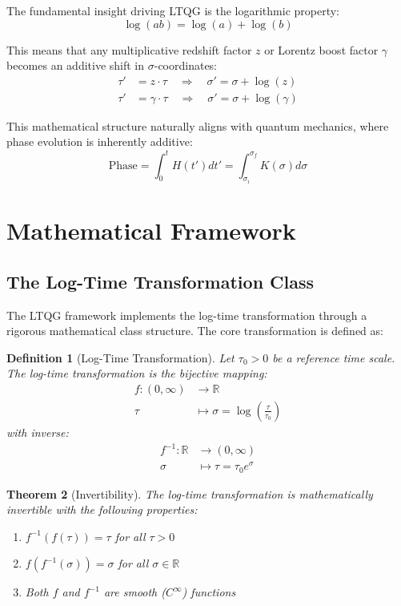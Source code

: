 \documentclass[11pt,a4paper]{article}
\newtheorem{theorem}{Theorem}[section]
\newtheorem{definition}[theorem]{Definition}
\begin{document}
The fundamental insight driving LTQG is the logarithmic property:
\begin{equation}
\log(ab) = \log(a) + \log(b)
\end{equation}

This means that any multiplicative redshift factor $z$ or Lorentz boost factor $\gamma$ becomes an additive shift in $\sigma$-coordinates:
\begin{align}
\tau' &= z \cdot \tau \quad \Rightarrow \quad \sigma' = \sigma + \log(z) \\
\tau' &= \gamma \cdot \tau \quad \Rightarrow \quad \sigma' = \sigma + \log(\gamma)
\end{align}

This mathematical structure naturally aligns with quantum mechanics, where phase evolution is inherently additive:
\begin{equation}
\text{Phase} = \int_0^t H(t') dt' = \int_{\sigma_i}^{\sigma_f} K(\sigma) d\sigma
\end{equation}

\section{Mathematical Framework}

\subsection{The Log-Time Transformation Class}

The LTQG framework implements the log-time transformation through a rigorous mathematical class structure. The core transformation is defined as:

\begin{definition}[Log-Time Transformation]
Let $\tau_0 > 0$ be a reference time scale. The log-time transformation is the bijective mapping:
\begin{align}
f: (0, \infty) &\to \mathbb{R} \\
\tau &\mapsto \sigma = \log\left(\frac{\tau}{\tau_0}\right)
\end{align}
with inverse:
\begin{align}
f^{-1}: \mathbb{R} &\to (0, \infty) \\
\sigma &\mapsto \tau = \tau_0 e^{\sigma}
\end{align}
\end{definition}

\begin{theorem}[Invertibility]
The log-time transformation is mathematically invertible with the following properties:
\begin{enumerate}
\item $f^{-1}(f(\tau)) = \tau$ for all $\tau > 0$
\item $f(f^{-1}(\sigma)) = \sigma$ for all $\sigma \in \mathbb{R}$
\item Both $f$ and $f^{-1}$ are smooth ($C^{\infty}$) functions
\end{enumerate}
\end{theorem}
\end{document}
